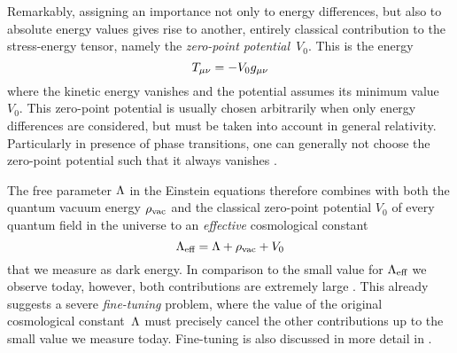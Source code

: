 Remarkably, assigning an importance not only to energy differences, but also to absolute energy values gives rise to another, entirely classical contribution to the stress-energy tensor, namely the \emph{zero-point potential}~\(V_0\). This is the energy
\begin{equation}
	T_{\mu\nu} = - V_0 g_{\mu\nu}
\end{equation}
where the kinetic energy vanishes and the potential assumes its minimum value~\(V_0\). This zero-point potential is usually chosen arbitrarily when only energy differences are considered, but must be taken into account in general relativity. Particularly in presence of phase transitions, one can generally not choose the zero-point potential such that it always vanishes \autocite{Martin2012}.

The free parameter \(\Lambda\) in the Einstein equations therefore combines with both the quantum vacuum energy \(\rho_\textnormal{vac}\) and the classical zero-point potential \(V_0\) of every quantum field in the universe to an \emph{effective} cosmological constant
\begin{equation}
	\Lambda_\textnormal{eff} = \Lambda + \rho_\textnormal{vac} + V_0
\end{equation}
that we measure as dark energy. In comparison to the small value for \(\Lambda_\textnormal{eff}\) we observe today, however, both contributions are extremely large \autocite{Martin2012}. This already suggests a severe \emph{fine-tuning} problem, where the value of the original cosmological constant~\(\Lambda\) must precisely cancel the other contributions up to the small value we measure today. Fine-tuning is also discussed in more detail in .

